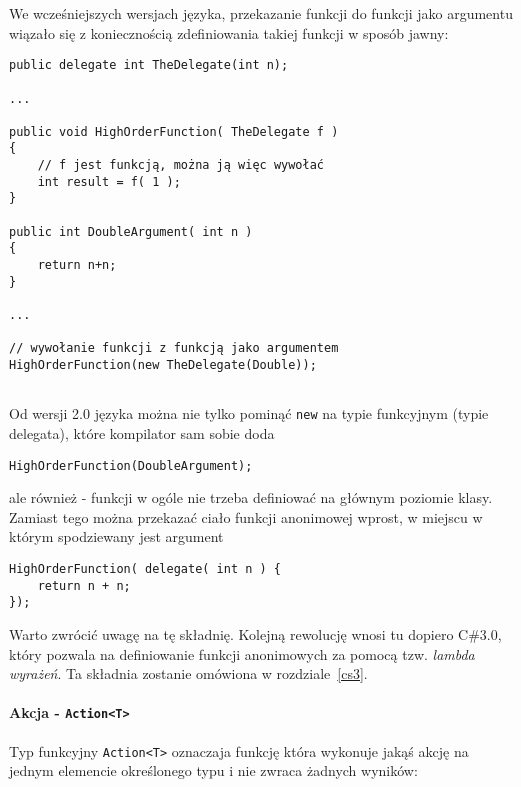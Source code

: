We wcześniejszych wersjach języka, przekazanie funkcji do funkcji jako argumentu wiązało się z koniecznością zdefiniowania takiej funkcji w sposób jawny:

\begin{scriptsize}
\begin{verbatim}
public delegate int TheDelegate(int n);

...

public void HighOrderFunction( TheDelegate f )
{
    // f jest funkcją, można ją więc wywołać
    int result = f( 1 );
}

public int DoubleArgument( int n )
{
    return n+n;
}

...

// wywołanie funkcji z funkcją jako argumentem
HighOrderFunction(new TheDelegate(Double));


\end{verbatim}
\end{scriptsize}

Od wersji 2.0 języka można nie tylko pominąć {\tt new} na typie funkcyjnym (typie delegata), które kompilator sam sobie doda

\begin{scriptsize}
\begin{verbatim}
HighOrderFunction(DoubleArgument);
\end{verbatim}
\end{scriptsize}

ale również - funkcji w ogóle nie trzeba definiować na głównym poziomie klasy. Zamiast tego można przekazać ciało funkcji anonimowej
wprost, w miejscu w którym spodziewany jest argument

\begin{scriptsize}
\begin{verbatim}
HighOrderFunction( delegate( int n ) {
    return n + n;
});
\end{verbatim}
\end{scriptsize}

Warto zwrócić uwagę na tę składnię. Kolejną rewolucję wnosi tu dopiero C\#3.0, który pozwala na definiowanie funkcji anonimowych za pomocą
tzw. {\em lambda wyrażeń}. Ta składnia zostanie omówiona w rozdziale~\ref{cs3}. 

\paragraph{Akcja - {\tt Action<T>}}

Typ funkcyjny {\tt Action<T>} oznaczaja funkcję która wykonuje jakąś akcję na jednym elemencie określonego typu i nie zwraca żadnych wyników:

